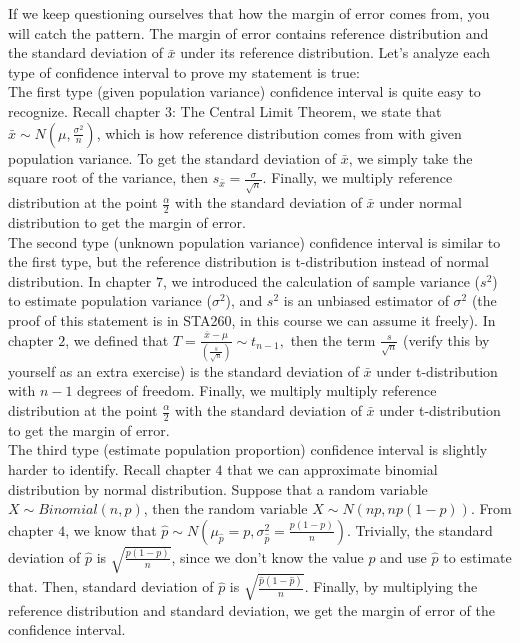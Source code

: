 \noindent
If we keep questioning ourselves that how the margin of error comes from, you will catch the pattern. The margin of error contains reference distribution and the standard deviation of $\bar{x}$ under its reference distribution. Let's analyze each type of confidence interval to prove my statement is true:\\

\noindent
The first type (given population variance) confidence interval is quite easy to recognize. Recall chapter $3$: The Central Limit Theorem, we state that $\bar{x} \sim N(\mu, \frac{\sigma^2}{n})$, which is how reference distribution comes from with given population variance. To get the standard deviation of $\bar{x}$, we simply take the square root of the variance, then $s_{\bar{x}} = \frac{\sigma}{\sqrt{n}}$. Finally, we multiply reference distribution at the point $\frac{\alpha}{2}$ with the standard deviation of $\bar{x}$ under normal distribution to get the margin of error.\\

\noindent
The second type (unknown population variance) confidence interval is similar to the first type, but the reference distribution is t-distribution instead of normal distribution. In chapter $7$, we introduced the calculation of sample variance ($s^2$) to estimate population variance ($\sigma^2$), and $s^2$ is an unbiased estimator of $\sigma^2$ (the proof of this statement is in STA260, in this course we can assume it freely). In chapter $2$, we defined that $T = \frac{\bar{x} - \mu}{(\frac{s}{\sqrt{n}})} \sim t_{n-1},$ then the term $\frac{s}{\sqrt{n}}$ (verify this by yourself as an extra exercise) is the standard deviation of $\bar{x}$ under t-distribution with $n-1$ degrees of freedom. Finally, we multiply multiply reference distribution at the point $\frac{\alpha}{2}$ with the standard deviation of $\bar{x}$ under t-distribution to get the margin of error.\\

\noindent
The third type (estimate population proportion) confidence interval is slightly harder to identify. Recall chapter $4$ that we can approximate binomial distribution by normal distribution. Suppose that a random variable $X \sim Binomial(n,p)$, then the random variable $X \sim N(np, np(1-p)).$ From chapter $4$, we know that $\hat{p} \sim N(\mu_{\hat{p}} = p, \sigma_{\hat{p}}^{2} = \frac{p(1-p)}{n})$. Trivially, the standard deviation of $\hat{p}$ is $\sqrt{\frac{p(1-p)}{n}}$, since we don't know the value $p$ and use $\hat{p}$ to estimate that. Then, standard deviation of $\hat{p}$ is $\sqrt{\frac{\hat{p}(1-\hat{p})}{n}}$. Finally, by multiplying the reference distribution and standard deviation, we get the margin of error of the confidence interval.\\

